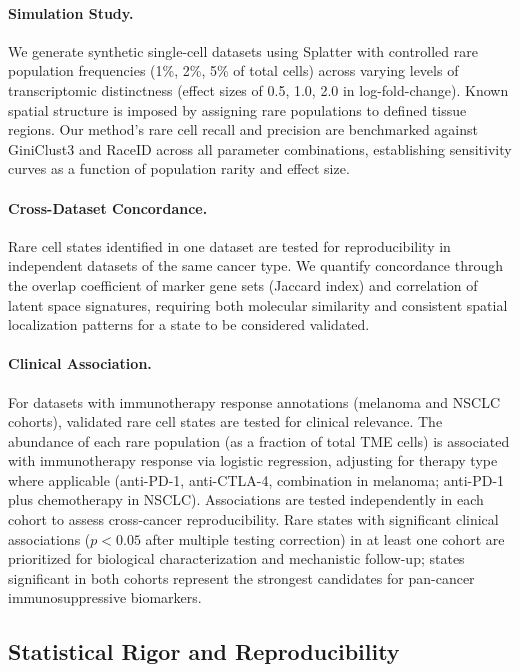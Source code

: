 \documentclass{article}
\begin{document}
\paragraph{Simulation Study.} We generate synthetic single-cell datasets using Splatter \cite{zappia2017splatter} with controlled rare population frequencies (1\%, 2\%, 5\% of total cells) across varying levels of transcriptomic distinctness (effect sizes of 0.5, 1.0, 2.0 in log-fold-change). Known spatial structure is imposed by assigning rare populations to defined tissue regions. Our method's rare cell recall and precision are benchmarked against GiniClust3 \cite{tsoucas2018giniclust2} and RaceID \cite{grun2015single} across all parameter combinations, establishing sensitivity curves as a function of population rarity and effect size.

\paragraph{Cross-Dataset Concordance.} Rare cell states identified in one dataset are tested for reproducibility in independent datasets of the same cancer type. We quantify concordance through the overlap coefficient of marker gene sets (Jaccard index) and correlation of latent space signatures, requiring both molecular similarity and consistent spatial localization patterns for a state to be considered validated.

\paragraph{Clinical Association.} For datasets with immunotherapy response annotations (melanoma and NSCLC cohorts), validated rare cell states are tested for clinical relevance. The abundance of each rare population (as a fraction of total TME cells) is associated with immunotherapy response via logistic regression, adjusting for therapy type where applicable (anti-PD-1, anti-CTLA-4, combination in melanoma; anti-PD-1 plus chemotherapy in NSCLC). Associations are tested independently in each cohort to assess cross-cancer reproducibility. Rare states with significant clinical associations ($p < 0.05$ after multiple testing correction) in at least one cohort are prioritized for biological characterization and mechanistic follow-up; states significant in both cohorts represent the strongest candidates for pan-cancer immunosuppressive biomarkers.


\subsection{Statistical Rigor and Reproducibility}
\end{document}
